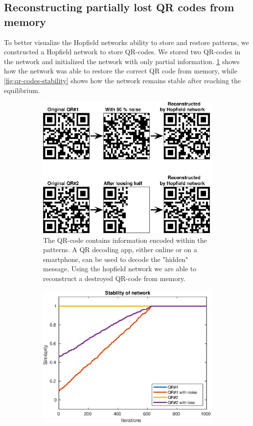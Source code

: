 \subsection{Reconstructing partially lost QR codes from memory} \label{sec:qr-codes}
To better visualize the Hopfield networks ability to store and restore patterns, we constructed a Hopfield network to store QR-codes. We stored two QR-codes in the network and initialized the network with only partial information. \cref{fig:qr-codes} shows how the network was able to restore the correct QR code from memory, while \cref{fig:qr-codes-stability} shows how the network remains stable after reaching the equilibrium.
\begin{figure}[H]
    \centering
    \begin{subfigure}{0.49\textwidth}
        \includegraphics[width=\textwidth]{figs/qr-code}
        \caption{The QR-code contains information encoded within the patterns. A QR decoding app, either online or on a smartphone, can be used to decode the "hidden" message. Using the hopfield network we are able to reconstruct a destroyed QR-code from memory.}
        \label{fig:qr-codes}
    \end{subfigure}
    \begin{subfigure}{0.49\textwidth}
        \includegraphics[width=\textwidth]{figs/qr-code-sim}

\end{subfigure}
\end{figure}
